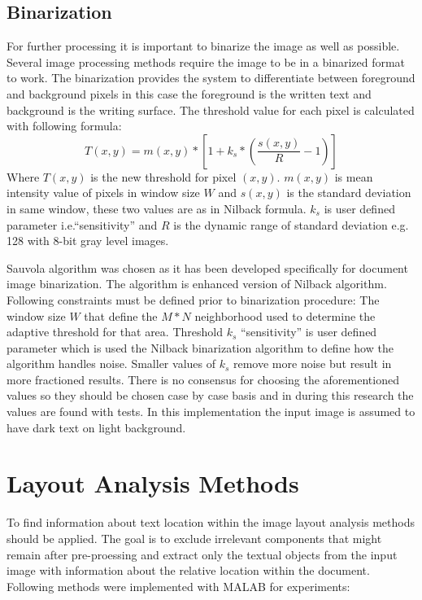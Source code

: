 \documentclass{article}
\begin{document}
        \subsection{Binarization}
          For further processing it is important to binarize the image as well as possible. Several image processing methods require the image to be in a binarized format to work. The binarization provides the system to differentiate between foreground and background pixels in this case the foreground is the written text and background is the writing surface. The threshold value for each pixel is calculated with following formula:
          \begin{equation}
            T(x,y) = m(x,y)*\left[1+k_s*\left(\frac{s(x,y)}{R}-1\right)\right]
          \end{equation}
          Where $T(x,y)$ is the new threshold for pixel $(x,y)$. $m(x,y)$ is mean intensity value of pixels in window size $W$ and $s(x,y)$ is the standard deviation in same window, these two values are as in Nilback formula. $k_s$ is user defined parameter i.e.``sensitivity'' and  $R$ is the dynamic range of standard deviation e.g. 128 with 8-bit gray level images.

          Sauvola algorithm was chosen as it has been developed specifically for document image binarization. The algorithm is enhanced version of Nilback algorithm. \cite{Sauvola2000} Following constraints must be defined prior to binarization procedure: The window size $W$ that define the $M * N$ neighborhood used to determine the adaptive threshold for that area. Threshold $k_s$ ``sensitivity'' is user defined parameter which is used the Nilback binarization algorithm to define how the algorithm handles noise. Smaller values of $k_s$ remove more noise but result in more fractioned results. There is no consensus for choosing the aforementioned values so they should be chosen case by case basis and in during this research the values are found with tests. In this implementation the input image is assumed to have dark text on light background.

    \newpage
    \section{Layout Analysis Methods}
      To find information about text location within the image layout analysis methods should be applied. The goal is to exclude irrelevant components that might remain after pre-proessing and extract only the textual objects from the input image with information about the relative location within the document. Following methods were implemented with MALAB for experiments:
\end{document}
